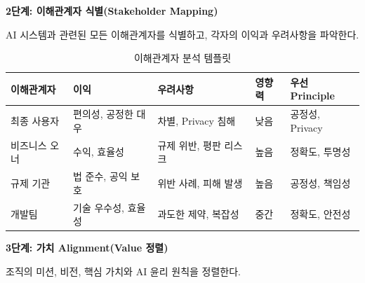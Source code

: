 \textbf{2단계: 이해관계자 식별(Stakeholder Mapping)}

AI 시스템과 관련된 모든 이해관계자를 식별하고, 
각자의 이익과 우려사항을 파악한다.

\begin{table}[htbp]
\centering
\caption{이해관계자 분석 템플릿}
\label{tab:stakeholder_analysis}
\begin{tabular}{p{2.5cm}p{3cm}p{3cm}p{2.5cm}p{2.5cm}}
\toprule
\textbf{이해관계자} & \textbf{이익} & \textbf{우려사항} & \textbf{영향력} & \textbf{우선 Principle} \\
\midrule
최종 사용자 & 
편의성, 공정한 대우 & 
차별, Privacy 침해 & 
낮음 & 
공정성, Privacy \\
\midrule
비즈니스 오너 & 
수익, 효율성 & 
규제 위반, 평판 리스크 & 
높음 & 
정확도, 투명성 \\
\midrule
규제 기관 & 
법 준수, 공익 보호 & 
위반 사례, 피해 발생 & 
높음 & 
공정성, 책임성 \\
\midrule
개발팀 & 
기술 우수성, 효율성 & 
과도한 제약, 복잡성 & 
중간 & 
정확도, 안전성 \\
\bottomrule
\end{tabular}
\end{table}

\textbf{3단계: 가치 Alignment(Value 정렬)}

조직의 미션, 비전, 핵심 가치와 AI 윤리 원칙을 정렬한다.

